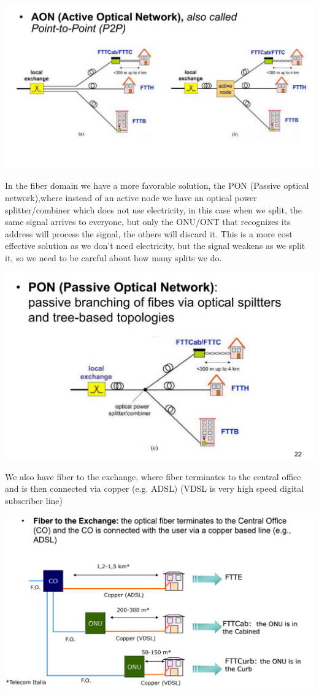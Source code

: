 \documentclass[11pt, a4paper]{article}
\begin{document}
\begin{center}
    \includegraphics[scale=0.5]{img/AccessNetworks/FTTX/AON.png}
\end{center}
In the fiber domain we have a more favorable solution, the PON (Passive optical network),where instead of an active node we have an optical power splitter/combiner which does not use electricity, in this case when we split, the same signal arrives to everyone, but only the ONU/ONT that recognizes its address will process the signal, the others will discard it. This is a more cost effective solution as we don't need electricity, but the signal weakens as we split it, so we need to be careful about how many splits we do.
\begin{center}
    \includegraphics[scale=0.5]{img/AccessNetworks/FTTX/PON.png}
\end{center}
We also have fiber to the exchange, where fiber terminates to the central office and is then connected via copper (e.g. ADSL) (VDSL is very high speed digital subscriber line)
\begin{center}
    \includegraphics[scale=0.5]{img/AccessNetworks/FTTX/FTTX.png}
\end{center}
\end{document}
